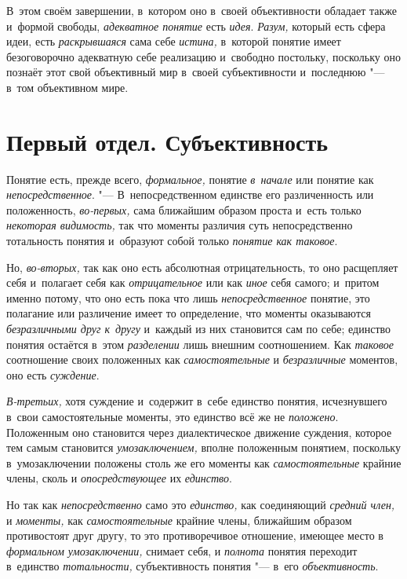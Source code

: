 В~этом своём завершении, в~котором оно в~своей объективности
обладает также и~формой свободы, {\em адекватное понятие} есть
{\em идея}. {\em Разум,} который есть сфера идеи, есть {\em раскрывшаяся}
сама себе {\em истина,} в~которой понятие имеет безоговорочно адекватную себе
реализацию и~свободно постольку, поскольку оно познаёт этот свой
объективный мир в~своей субъективности и~последнюю "--- в~том объективном мире.

\part[Первый отдел\texorpdfstring{\\}{} СУБЪЕКТИВНОСТЬ]{Первый отдел. Субъективность}

Понятие есть, прежде всего, {\em формальное,} понятие {\em в~начале} или
понятие как {\em непосредственное}. "---
В~непосредственном единстве его различенность или
положенность, {\em во-первых,} сама ближайшим образом проста и~есть только
{\em некоторая видимость,} так что моменты различия суть непосредственно
тотальность понятия и~образуют собой только {\em понятие как таковое}.

Но, {\em во-вторых,} так как оно есть абсолютная отрицательность, то оно
расщепляет себя и~полагает себя как {\em отрицательное} или
как {\em иное} себя самого; и~притом именно потому, что оно есть пока что лишь
{\em непосредственное} понятие, это полагание или различение имеет то
определение, что моменты оказываются {\em безразличными друг к~другу}
и~каждый из них становится сам по себе; единство понятия
остаётся в~этом {\em разделении} лишь внешним соотношением. Как
{\em таковое} соотношение своих положенных как {\em самостоятельные} и
{\em безразличные} моментов, оно есть {\em суждение}.

{\em В-третьих,} хотя
суждение и~содержит в~себе единство понятия, исчезнувшего в~свои
самостоятельные моменты, это единство всё же не {\em положено}.
Положенным оно становится через диалектическое движение
суждения, которое тем самым становится {\em умозаключением,}
вполне положенным понятием, поскольку в~умозаключении
положены столь же его моменты как {\em самостоятельные}
крайние члены, сколь и {\em опосредствующее} их {\em единство}.

Но так как {\em непосредственно} само это {\em единство,} как соединяющий
{\em средний член,} и {\em моменты,} как {\em самостоятельные}
крайние члены, ближайшим образом противостоят друг другу, то
это противоречивое отношение, имеющее место в
{\em формальном умозаключении,} снимает себя, и {\em полнота} понятия
переходит в~единство {\em тотальности,}
субъективность понятия "--- в~его {\em объективность}.

